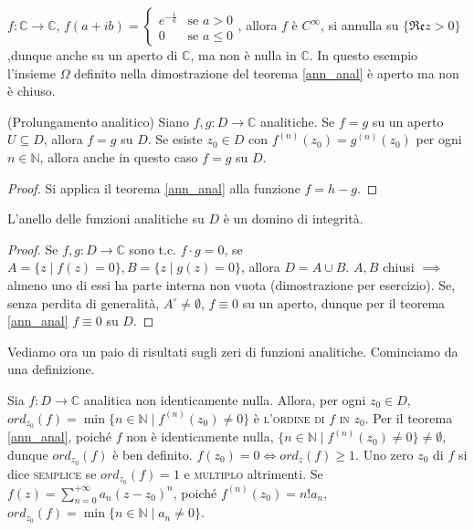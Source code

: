 \begin{ex}
  $f: \mathbb{C} \longrightarrow \mathbb{C}$, $f(a+ib)=\begin{cases} e^{-\frac{1}{a}} & \mbox{se }a>0 \\ 0 & \mbox{se }a \le 0

\end{cases}$, allora $f$ è $C^{\infty}$, si annulla su $\{\mathfrak{Re}z>0\}$,dunque anche su un aperto di $\mathbb{C}$, ma non è nulla in $\mathbb{C}$. In questo esempio l'insieme $\Omega$ definito nella dimostrazione del teorema \ref{ann_anal} è aperto ma non è chiuso.
\end{ex}

\begin{cor}
  (Prolungamento analitico) Siano $f, g:D \longrightarrow \mathbb{C}$ analitiche. Se $f=g$ su un aperto $U \subseteq D$, allora $f=g$ su $D$. Se esiste $z_0 \in D$ con $f^{(n)}(z_0)=g^{(n)}(z_0)$ per ogni $n \in \mathbb{N}$, allora anche in questo caso $f=g$ su $D$.
\end{cor}

\begin{proof}
  Si applica il teorema \ref{ann_anal} alla funzione $f=h-g$.
\end{proof}

\begin{cor}
  L'anello delle funzioni analitiche su $D$ è un domino di integrità.
\end{cor}

\begin{proof}
  Se $f, g:D \longrightarrow \mathbb{C}$ sono t.c. $f \cdot g=0$, se $A=\{z \mid f(z)=0\}, B=\{z \mid g(z)=0\}$, allora $D=A \cup B$. $A, B$ chiusi $\implies$ almeno uno di essi ha parte interna non vuota (dimostrazione per esercizio). Se, senza perdita di generalità, $A^{\circ}\not=\emptyset$, $f \equiv 0$ su un aperto, dunque per il teorema \ref{ann_anal} $f \equiv 0$ su $D$.
\end{proof}

Vediamo ora un paio di risultati sugli zeri di funzioni analitiche. Cominciamo da una definizione.

\begin{defn}
  Sia $f:D \longrightarrow \mathbb{C}$ analitica non identicamente nulla. Allora, per ogni $z_0 \in D$, $ord_{z_0}(f)=\min{\{n \in \mathbb{N} \mid f^{(n)}(z_0)\not=0\}}$ è \textsc{l'ordine di $f$ in $z_0$}.
  Per il teorema \ref{ann_anal}, poiché $f$ non è identicamente nulla, $\{n \in \mathbb{N} \mid f^{(n)}(z_0)\not=0\}\not=\emptyset$, dunque $ord_{z_0}(f)$ è ben definito. $f(z_0)=0 \iff ord_{z}(f) \ge 1$.
  Uno zero $z_0$ di $f$ si dice \textsc{semplice} se $ord_{z_0}(f)=1$ e \textsc{multiplo} altrimenti. Se $\displaystyle f(z)=\sum_{n=0}^{+\infty} a_n(z-z_0)^n$, poiché $f^{(n)}(z_0)=n!a_n$, $ord_{z_0}(f)=\min{\{n \in \mathbb{N} \mid a_n\not=0\}}$.
\end{defn}
